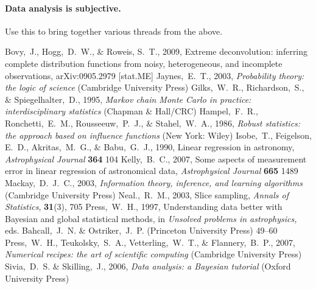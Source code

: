 \documentclass[12pt,twoside,pdftex]{article}
\begin{document}
\paragraph{Data analysis is subjective.}
Use this to bring together various threads from the above.

\clearpage
{}\theendnotes

\clearpage
\begin{thebibliography}{}
  Bovy,~J., Hogg,~D.~W., \& Roweis, S.~T., 2009,
  Extreme deconvolution: inferring complete distribution functions from noisy, heterogeneous, and incomplete observations, 
  arXiv:0905.2979 [stat.ME]
  Jaynes,~E.~T., 2003,
  \textit{Probability theory: the logic of science} (Cambridge University Press)
  Gilks,~W.~R., Richardson,~S., \& Spiegelhalter,~D., 1995,
  \textit{Markov chain Monte Carlo in practice: interdisciplinary statistics} (Chapman \& Hall/CRC)
  Hampel,~F.~R., Ronchetti,~E.~M., Rousseeuw,~P.~J., \& Stahel,~W.~A., 1986, 
  \textit{Robust statistics: the approach based on influence functions} (New York: Wiley)
  Isobe,~T., Feigelson, E.~D., Akritas,~M.~G., \& Babu,~G.~J., 1990,
  Linear regression in astronomy,
  \textit{Astrophysical Journal} \textbf{364} 104
  Kelly,~B.~C., 2007,
  Some aspects of measurement error in linear regression of astronomical data,
  \textit{Astrophysical Journal} \textbf{665} 1489
  Mackay,~D.~J.~C., 2003,
  \textit{Information theory, inference, and learning algorithms} (Cambridge University Press)
  Neal.,~R.~M., 2003,
  Slice sampling,
  \textit{Annals of Statistics}, \textbf{31}(3), 705
  Press,~W.~H., 1997,
  Understanding data better with Bayesian and global statistical methods,
  in \textit{Unsolved problems in astrophysics,}
  eds. Bahcall,~J.~N. \& Ostriker,~J.~P. (Princeton University Press)
  49--60
  Press,~W.~H., Teukolsky,~S.~A., Vetterling,~W.~T., \& Flannery,~B.~P., 2007,
  \textit{Numerical recipes: the art of scientific computing} (Cambridge University Press)
  Sivia,~D.~S. \& Skilling,~J., 2006,
  \textit{Data analysis: a Bayesian tutorial} (Oxford University Press)
\end{thebibliography}
\end{document}
